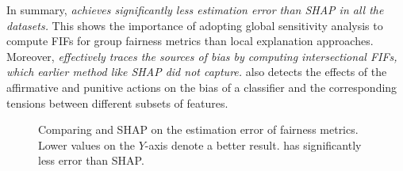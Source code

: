 In summary, \textit{{\fairXplainer} achieves significantly less estimation error than SHAP in all the datasets.} This shows the importance of adopting global sensitivity analysis to compute FIFs for group fairness metrics than local explanation approaches. Moreover, \textit{{\fairXplainer} effectively traces the sources of bias by computing intersectional FIFs, which earlier method like SHAP {did not capture}.} {\fairXplainer} also detects the effects of the affirmative and punitive actions on the bias of a classifier and the corresponding tensions between different subsets of features. %




\begin{figure}[!t]
	\begin{minipage}{0.49\textwidth}
		\centering
	\end{minipage}
	\begin{minipage}{0.5\textwidth}
		\centering
	\end{minipage}
	\caption[Accuracy of {\fairXplainer}]{Comparing {\fairXplainer} and SHAP on the estimation error of fairness metrics. Lower values on the $ Y $-axis denote a better result. {\fairXplainer} has significantly less error than SHAP.}\label{fig:estimation_error}
\end{figure}
